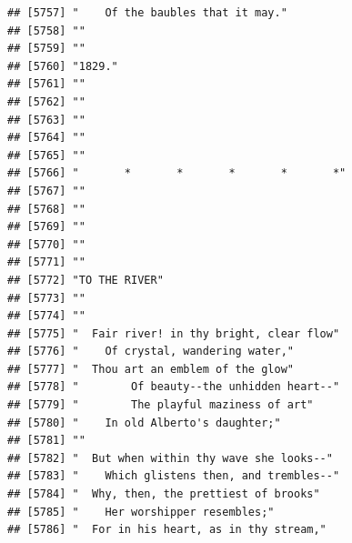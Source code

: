 \documentclass{article}\usepackage[]{graphicx}\usepackage[]{color}
\makeatletter
\newenvironment{kframe}{%
 \def\at@end@of@kframe{}%
 \ifinner\ifhmode%
  \def\at@end@of@kframe{\end{minipage}}%
  \begin{minipage}{\columnwidth}%
 \fi\fi%
 \def\FrameCommand##1{\hskip\@totalleftmargin \hskip-\fboxsep
 \colorbox{shadecolor}{##1}\hskip-\fboxsep
     \hskip-\linewidth \hskip-\@totalleftmargin \hskip\columnwidth}%
 \MakeFramed {\advance\hsize-\width
   \@totalleftmargin\z@ \linewidth\hsize
   \@setminipage}}%
 {\par\unskip\endMakeFramed%
 \at@end@of@kframe}
\newenvironment{knitrout}{}{} %
\makeatother
\begin{document}
\begin{knitrout}
\begin{kframe}
\begin{verbatim}
## [5757] "    Of the baubles that it may."                                             
## [5758] ""                                                                            
## [5759] ""                                                                            
## [5760] "1829."                                                                       
## [5761] ""                                                                            
## [5762] ""                                                                            
## [5763] ""                                                                            
## [5764] ""                                                                            
## [5765] ""                                                                            
## [5766] "       *       *       *       *       *"                                    
## [5767] ""                                                                            
## [5768] ""                                                                            
## [5769] ""                                                                            
## [5770] ""                                                                            
## [5771] ""                                                                            
## [5772] "TO THE RIVER"                                                                
## [5773] ""                                                                            
## [5774] ""                                                                            
## [5775] "  Fair river! in thy bright, clear flow"                                     
## [5776] "    Of crystal, wandering water,"                                            
## [5777] "  Thou art an emblem of the glow"                                            
## [5778] "        Of beauty--the unhidden heart--"                                     
## [5779] "        The playful maziness of art"                                         
## [5780] "    In old Alberto's daughter;"                                              
## [5781] ""                                                                            
## [5782] "  But when within thy wave she looks--"                                      
## [5783] "    Which glistens then, and trembles--"                                     
## [5784] "  Why, then, the prettiest of brooks"                                        
## [5785] "    Her worshipper resembles;"                                               
## [5786] "  For in his heart, as in thy stream,"                                       

\end{verbatim}
\end{kframe}
\end{knitrout}
\end{document}
